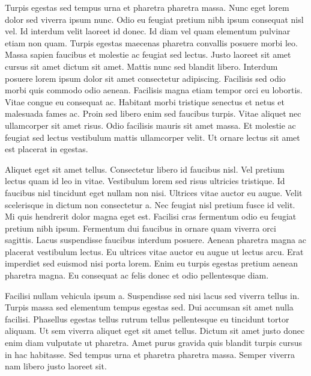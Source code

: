 Turpis egestas sed tempus urna et pharetra pharetra massa. Nunc eget lorem dolor sed viverra ipsum nunc. Odio eu feugiat pretium nibh ipsum consequat nisl vel. Id interdum velit laoreet id donec. Id diam vel quam elementum pulvinar etiam non quam. Turpis egestas maecenas pharetra convallis posuere morbi leo. Massa sapien faucibus et molestie ac feugiat sed lectus. Justo laoreet sit amet cursus sit amet dictum sit amet. Mattis nunc sed blandit libero. Interdum posuere lorem ipsum dolor sit amet consectetur adipiscing. Facilisis sed odio morbi quis commodo odio aenean. Facilisis magna etiam tempor orci eu lobortis. Vitae congue eu consequat ac. Habitant morbi tristique senectus et netus et malesuada fames ac. Proin sed libero enim sed faucibus turpis. Vitae aliquet nec ullamcorper sit amet risus. Odio facilisis mauris sit amet massa. Et molestie ac feugiat sed lectus vestibulum mattis ullamcorper velit. Ut ornare lectus sit amet est placerat in egestas.

Aliquet eget sit amet tellus. Consectetur libero id faucibus nisl. Vel pretium lectus quam id leo in vitae. Vestibulum lorem sed risus ultricies tristique. Id faucibus nisl tincidunt eget nullam non nisi. Ultrices vitae auctor eu augue. Velit scelerisque in dictum non consectetur a. Nec feugiat nisl pretium fusce id velit. Mi quis hendrerit dolor magna eget est. Facilisi cras fermentum odio eu feugiat pretium nibh ipsum. Fermentum dui faucibus in ornare quam viverra orci sagittis. Lacus suspendisse faucibus interdum posuere. Aenean pharetra magna ac placerat vestibulum lectus. Eu ultrices vitae auctor eu augue ut lectus arcu. Erat imperdiet sed euismod nisi porta lorem. Enim eu turpis egestas pretium aenean pharetra magna. Eu consequat ac felis donec et odio pellentesque diam.

Facilisi nullam vehicula ipsum a. Suspendisse sed nisi lacus sed viverra tellus in. Turpis massa sed elementum tempus egestas sed. Dui accumsan sit amet nulla facilisi. Phasellus egestas tellus rutrum tellus pellentesque eu tincidunt tortor aliquam. Ut sem viverra aliquet eget sit amet tellus. Dictum sit amet justo donec enim diam vulputate ut pharetra. Amet purus gravida quis blandit turpis cursus in hac habitasse. Sed tempus urna et pharetra pharetra massa. Semper viverra nam libero justo laoreet sit.

